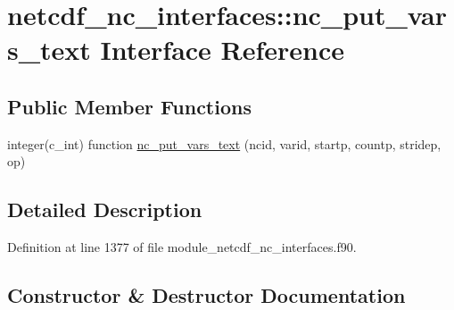\hypertarget{interfacenetcdf__nc__interfaces_1_1nc__put__vars__text}{}\section{netcdf\+\_\+nc\+\_\+interfaces\+:\+:nc\+\_\+put\+\_\+vars\+\_\+text Interface Reference}
\label{interfacenetcdf__nc__interfaces_1_1nc__put__vars__text}
\subsection*{Public Member Functions}
\begin{DoxyCompactItemize}
\item 
integer(c\+\_\+int) function \hyperlink{interfacenetcdf__nc__interfaces_1_1nc__put__vars__text_ac75ff1286228a9611d5828333f187156}{nc\+\_\+put\+\_\+vars\+\_\+text} (ncid, varid, startp, countp, stridep, op)
\end{DoxyCompactItemize}


\subsection{Detailed Description}


Definition at line 1377 of file module\+\_\+netcdf\+\_\+nc\+\_\+interfaces.\+f90.



\subsection{Constructor \& Destructor Documentation}
\mbox{\label{interfacenetcdf__nc__interfaces_1_1nc__put__vars__text_ac75ff1286228a9611d5828333f187156}} 
